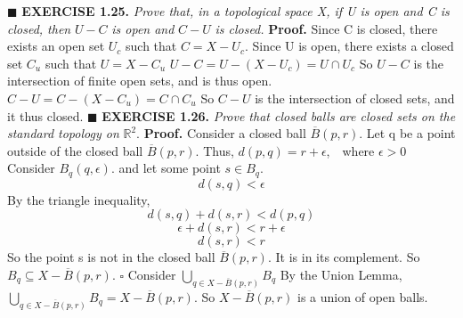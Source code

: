 \documentclass[12pt]{article}
\begin{document}
	\newline \(\blacksquare\)
	\newpage
	\noindent
	\textbf{EXERCISE 1.25.} \textit{Prove that, in a topological space X, if U is open and C is closed, then} \(U-C\) \textit{is open and} \(C-U\) \textit{is closed.} \newline \newline
	\textbf{Proof.} \newline
	Since C is closed, there exists an open set \(U_c\) such that \(C = X - U_c\). \newline
	Since U is open, there exists a closed set \(C_u\) such that \(U = X - C_u\) \newline \newline
	\(U - C = U - (X - U_c) = U \cap U_c\) \newline
	So \(U - C\) is the intersection of finite open sets, and is thus open.
	\newline \newline
	\(C - U = C - (X - C_u) = C \cap C_u\) \newline
	So \(C - U\) is the intersection of closed sets, and it thus closed.
	\newline \(\blacksquare\)
	\newpage
	\noindent
	\textbf{EXERCISE 1.26.} \textit{Prove that closed balls are closed sets on the standard topology on} \(\mathbb{R}^2\).
	\newline \newline
	\textbf{Proof.} \newline
	Consider a closed ball \(\overline{B}(p, r)\). \newline
	Let q be a point outside of the closed ball \(\overline{B}(p, r)\). \newline
	Thus, \(d(p, q) = r + \epsilon\),\ \ where \(\epsilon > 0\)\newline
	Consider \(B_q(q, \epsilon)\). and let some point \(s \in B_q\).
	\[d(s, q) < \epsilon\]
	By the triangle inequality,
	\[d(s, q) + d(s,r) < d(p,q)\]
	\[\epsilon + d(s,r) < r + \epsilon\]
	\[d(s,r) < r\]
	So the point s is not in the closed ball \(\overline{B}(p, r)\). It is in its complement. \newline
	So \(B_q \subseteq X - \overline{B}(p, r)\).
	\newline \(\square\) \newline
	Consider \(\bigcup_{q \in X - \overline{B}(p, r)} B_q\)
	\newline \newline
	By the Union Lemma, \(\bigcup_{q \in X - \overline{B}(p, r)} B_q = X - \overline{B}(p, r)\).
	So \(X - \overline{B}(p, r)\) is a union of open balls.
\end{document}
